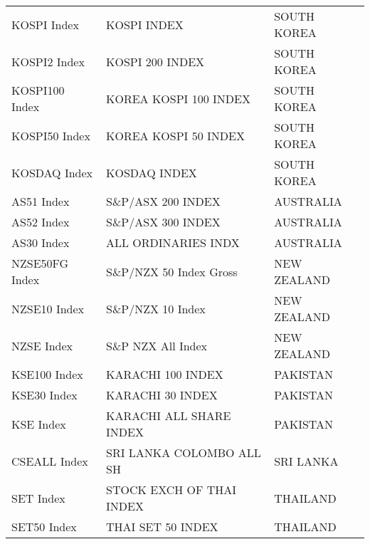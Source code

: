 \begin {table}[H]
\begin{center}
\begin{tabu}{| l l l |}
KOSPI Index & KOSPI INDEX & SOUTH KOREA \\ 
KOSPI2 Index & KOSPI 200 INDEX & SOUTH KOREA \\ 
KOSPI100 Index & KOREA KOSPI 100 INDEX & SOUTH KOREA \\ 
KOSPI50 Index & KOREA KOSPI 50 INDEX & SOUTH KOREA \\ 
KOSDAQ Index & KOSDAQ INDEX & SOUTH KOREA \\ 
AS51 Index & S\&P/ASX 200 INDEX & AUSTRALIA \\ 
AS52 Index & S\&P/ASX 300 INDEX & AUSTRALIA \\ 
AS30 Index & ALL ORDINARIES INDX & AUSTRALIA \\ 
NZSE50FG Index & S\&P/NZX 50 Index Gross & NEW ZEALAND \\ 
NZSE10 Index & S\&P/NZX 10 Index & NEW ZEALAND \\ 
NZSE Index & S\&P NZX All Index & NEW ZEALAND \\ 
KSE100 Index & KARACHI 100 INDEX & PAKISTAN \\ 
KSE30 Index & KARACHI 30 INDEX & PAKISTAN \\ 
KSE Index & KARACHI ALL SHARE INDEX & PAKISTAN \\ 
CSEALL Index & SRI LANKA COLOMBO ALL SH & SRI LANKA \\ 
SET Index & STOCK EXCH OF THAI INDEX & THAILAND \\ 
SET50 Index & THAI SET 50 INDEX & THAILAND \\ 

\hline
\end{tabu}
\hspace*{-3cm}
\small
\end{center}
\end{table}



